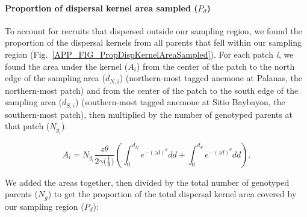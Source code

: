 \documentclass[12pt, oneside]{article}   	%
\begin{document}


\paragraph*{Proportion of dispersal kernel area sampled ($P_d$)} %

To account for recruits that dispersed outside our sampling region, we found the proportion of the dispersal kernels from all parents that fell within our sampling region (Fig.\ \ref{APP_FIG_PropDispKernelAreaSampled}). For each patch \textit{i}, we found the area under the kernel ($A_i$) from the center of the patch to the north edge of the sampling area ($d_{N,i}$) (northern-most tagged anemone at Palanas, the northern-most patch) and from the center of the patch to the south edge of the sampling area ($d_{S,i}$) (southern-most tagged anemone at Sitio Baybayon, the southern-most patch), then multiplied by the number of genotyped parents at that patch ($N_{g_i}$):

\begin{equation} 
A_i = N_{g_i} \frac{z\theta}{2\gamma({\frac{1}{\theta})}} \left( \int_{0}^{d_N}e^{-(zd)^\theta}  dd + \int_{0}^{d_S}e^{-(zd)^\theta}  dd \right). 
\end{equation}

We added the areas together, then divided by the total number of genotyped parents ($N_g$) to get the proportion of the total dispersal kernel area covered by our sampling region ($P_d$):
\end{document}
